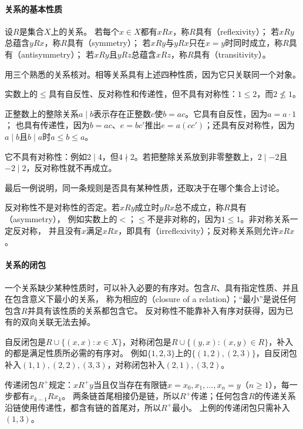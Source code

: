 \paragraph{关系的基本性质}
设$R$是集合$X$上的关系。
若每个$x\in X$都有$xRx$，称$R$具有（reflexivity）；
若$xRy$总蕴含$yRx$，称$R$具有（symmetry）；
若$xRy$与$yRx$只在$x=y$时同时成立，称$R$具有（antisymmetry）；
若$xRy$且$yRz$总蕴含$xRz$，称$R$具有（transitivity）。

用三个熟悉的关系核对。相等关系具有上述四种性质，因为它只关联同一个对象。

实数上的$\leq$具有自反性、反对称性和传递性，但不具有对称性：$1\leq2$，而$2\not\leq1$。

\begin{example}[整除关系的性质]
\label{ex:sets-divisibility-properties}
正整数上的整除关系$a\mid b$表示存在正整数$c$使$b=ac$。它具有自反性，因为$a=a\cdot1$；
也具有传递性，因为$b=ac$、$e=bc'$推出$e=a(cc')$；还具有反对称性，因为$a\mid b$且$b\mid a$时$a\leq b\leq a$。

它不具有对称性：例如$2\mid4$，但$4\nmid2$。若把整除关系放到非零整数上，$2\mid-2$且$-2\mid2$，反对称性就不再成立。
\end{example}
最后一例说明，同一条规则是否具有某种性质，还取决于在哪个集合上讨论。

反对称性不是对称性的否定。若$xRy$成立时$yRx$总不成立，称$R$具有（asymmetry），
例如实数上的$<$；$\leq$不是非对称的，因为$1\leq1$。非对称关系一定反对称，
并且没有$x$满足$xRx$，即具有（irreflexivity）；反对称关系则允许$xRx$。

\paragraph{关系的闭包}
一个关系缺少某种性质时，可以补入必要的有序对。包含$R$、具有指定性质、并且在包含意义下最小的关系，
称为相应的（closure of a relation）；“最小”是说任何包含$R$并具有该性质的关系都包含它。
反对称性不能靠补入有序对获得，因为已有的双向关联无法去掉。

自反闭包是$R\cup\{(x,x):x\in X\}$，对称闭包是$R\cup\{(y,x):(x,y)\in R\}$，补入的都是满足性质所必需的有序对。
例如$\{1,2,3\}$上的$\{(1,2),(2,3)\}$，自反闭包补入$(1,1),(2,2),(3,3)$，对称闭包补入$(2,1),(3,2)$。

传递闭包$R^+$规定：$xR^+y$当且仅当存在有限链$x=x_0,x_1,\ldots,x_n=y$（$n\geq1$），每一步都有$x_{k-1}Rx_k$。
两条链首尾相接仍是链，所以$R^+$传递；任何包含$R$的传递关系沿链使用传递性，都含有链的首尾对，所以$R^+$最小。
上例的传递闭包只需补入$(1,3)$。

